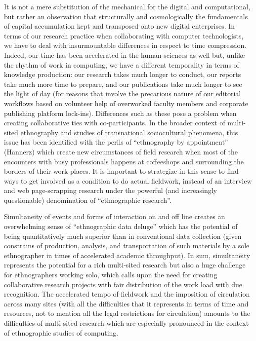 \documentclass[10pt,letter,oneside]{scrartcl}
\begin{document}
  It is not a mere substitution of the mechanical for the digital and
  computational, but rather an observation that structurally and
  cosmologically the fundamentals of capital accumulation kept and
  transposed onto new digital enterprises.  In terms of our research
  practice when collaborating with computer technologists, we have to
  deal with insurmountable differences in respect to time
  compression. Indeed, our time has been accelerated in the human
  sciences as well but, unlike the rhythm of work in computing, we
  have a different temporality in terms of knowledge production: our
  research takes much longer to conduct, our reports take much more
  time to prepare, and our publications take much longer to see the
  light of day (for reasons that involve the precarious nature of our
  editorial workflows based on volunteer help of overworked faculty
  members and corporate publishing platform lock-ins). Differences
  such as these pose a problem when creating collaborative ties with
  co-participants. In the broader context of multi-sited ethnography
  and studies of transnational sociocultural phenomena, this issue has
  been identified with the perils of ``ethnography by appointment''
  (Hannerz) which create new circumstances of field research when most
  of the encounters with busy professionals happens at coffeeshops and
  surrounding the borders of their work places. It is important to
  strategize in this sense to find ways to get involved as a condition
  to do actual fieldwork, instead of an interview and web
  page-scrapping research under the powerful (and increasingly
  questionable) denomination of ``ethnographic research''.


  Simultaneity of events and forms of interaction on and off line
  creates an overwhelming sense of ``ethnographic data deluge'' which
  has the potential of being quantitatively much superior than in
  conventional data collection (given constrains of production,
  analysis, and transportation of such materials by a sole
  ethnographer in times of accelerated academic throughput). In sum,
  simultaneity represents the potential for a rich multi-sited
  research but also a huge challenge for ethnographers working solo,
  which calls upon the need for creating collaborative research
  projects with fair distribution of the work load with due
  recognition. The accelerated tempo of fieldwork and the imposition
  of circulation across many sites (with all the difficulties that it
  represents in terms of time and resources, not to mention all the
  legal restrictions for circulation) amounts to the difficulties of
  multi-sited research which are especially pronounced in the context
  of ethnographic studies of computing.
\end{document}
